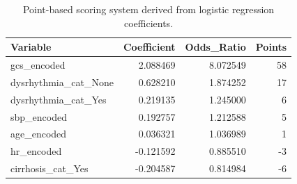 \begin{table}
\caption{Point-based scoring system derived from logistic regression coefficients.}
\begin{tabular}{lrrr}
\toprule
Variable & Coefficient & Odds_Ratio & Points \\
\midrule
gcs_encoded & 2.088469 & 8.072549 & 58 \\
dysrhythmia_cat_None & 0.628210 & 1.874252 & 17 \\
dysrhythmia_cat_Yes & 0.219135 & 1.245000 & 6 \\
sbp_encoded & 0.192757 & 1.212588 & 5 \\
age_encoded & 0.036321 & 1.036989 & 1 \\
hr_encoded & -0.121592 & 0.885510 & -3 \\
cirrhosis_cat_Yes & -0.204587 & 0.814984 & -6 \\
\bottomrule
\end{tabular}
\end{table}
